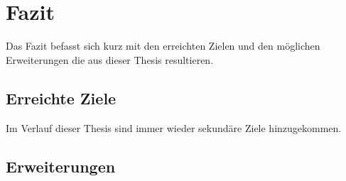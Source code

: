 \section{Fazit}
\label{sec:conclusion}
Das Fazit befasst sich kurz mit den erreichten Zielen und den möglichen Erweiterungen die aus dieser Thesis resultieren. 

\subsection{Erreichte Ziele}
Im Verlauf dieser Thesis sind immer wieder sekundäre Ziele hinzugekommen. 


\subsection{Erweiterungen} 